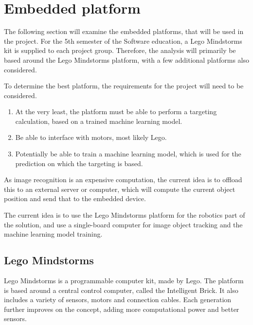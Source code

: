 \section{Embedded platform}
The following section will examine the embedded platforms, that will be used in the project.
For the 5th semester of the Software education, a Lego Mindstorms kit is supplied to each project group.
Therefore, the analysis will primarily be based around the Lego Mindstorms platform, with a few additional platforms also considered.

To determine the best platform, the requirements for the project will need to be considered.
\begin{enumerate}
	\item At the very least, the platform must be able to perform a targeting calculation, based on a trained machine learning model.
	\item Be able to interface with motors, most likely Lego.
	\item Potentially be able to train a machine learning model, which is used for the prediction on which the targeting is based.
\end{enumerate}

As image recognition is an expensive computation, the current idea is to offload this to an external server or computer, which will compute the current object position and send that to the embedded device.

The current idea is to use the Lego Mindstorms platform for the robotics part of the solution, and use a single-board computer for image object tracking and the machine learning model training.

\subsection{Lego Mindstorms}
Lego Mindstorms is a programmable computer kit, made by Lego.
The platform is based around a central control computer, called the Intelligent Brick.
It also includes a variety of sensors, motors and connection cables.
Each generation further improves on the concept, adding more computational power and better sensors.

